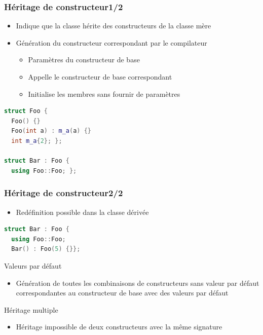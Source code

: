 \documentclass[C++.tex]{subfiles}
\begin{document}
\begin{frame}[fragile]
	\frametitle{Héritage de constructeur\titlehfill{}1/2}
	\begin{itemize}
		\item Indique que la classe hérite des constructeurs de la classe mère
		\item Génération du constructeur correspondant par le compilateur
		\begin{itemize}
			\item Paramètres du constructeur de base
			\item Appelle le constructeur de base correspondant
			\item Initialise les membres sans fournir de paramètres

		\end{itemize}
	\end{itemize}

	\begin{lstlisting}[language=C++]
struct Foo {
  Foo() {}
  Foo(int a) : m_a(a) {}
  int m_a{2}; };

struct Bar : Foo {
  using Foo::Foo; };\end{lstlisting}
\end{frame}

\begin{frame}[fragile]
	\frametitle{Héritage de constructeur\titlehfill{}2/2}
	\begin{itemize}
		\item Redéfinition possible dans la classe dérivée
	\end{itemize}

	\begin{lstlisting}[language=C++]
struct Bar : Foo {
  using Foo::Foo;
  Bar() : Foo(5) {}};\end{lstlisting}

	\begin{alertblock}{Valeurs par défaut}
		\begin{itemize}
			\item Génération de toutes les combinaisons de constructeurs sans valeur par défaut correspondantes au constructeur de base avec des valeurs par défaut
		\end{itemize}

	\end{alertblock}

	\begin{alertblock}{Héritage multiple}
		\begin{itemize}
			\item Héritage impossible de deux constructeurs avec la même signature
		\end{itemize}
	\end{alertblock}

\end{frame}
\end{document}
